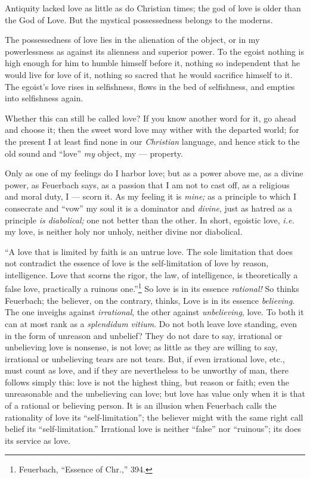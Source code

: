 Antiquity lacked love as little as do Christian times; the god of love is 
older than the God of Love. But the mystical possessedness belongs to the 
moderns.

The possessedness of love lies in the alienation of the object, or in my 
powerlessness as against its alienness and superior power. To the egoist 
nothing is high enough for him to humble himself before it, nothing so 
independent that he would live for love of it, nothing so sacred that he would 
sacrifice himself to it. The egoist's love rises in selfishness, flows in the 
bed of selfishness, and empties into selfishness again.

Whether this can still be called love? If you know another word for it, go 
ahead and choose it; then the sweet word love may wither with the departed 
world; for the present I at least find none in our \textit{Christian} 
language, and hence stick to the old sound and ``love'' \textit{my} object, 
my --- property.

Only as one of my feelings do I harbor love; but as a power above me, as a 
divine power, as Feuerbach says, as a passion that I am not to cast off, as a 
religious and moral duty, I --- scorn it. As my feeling it is \textit{mine;} as 
a principle to which I consecrate and ``vow'' my soul it is a dominator and 
\textit{divine}, just as hatred as a principle \textit{is diabolical;} one not 
better than the other. In short, egoistic love, \textit{i.e.} my love, is 
neither holy nor unholy, neither divine nor diabolical.

``A love that is limited by faith is an untrue love. The sole limitation that 
does not contradict the essence of love is the self-limitation of love by 
reason, intelligence. Love that scorns the rigor, the law, of intelligence, is 
theoretically a false love, practically a ruinous one.''\footnote{Feuerbach, 
``Essence of Chr.,'' 394.} So love is in its essence \textit{rational!} So 
thinks Feuerbach; the believer, on the contrary, thinks, Love is in its 
essence \textit{believing}. The one inveighs against \textit{irrational}, the 
other against \textit{unbelieving}, love. To both it can at most rank as a 
\textit{splendidum vitium}. Do not both leave love standing, even in the form 
of unreason and unbelief? They do not dare to say, irrational or unbelieving 
love is nonsense, is not love; as little as they are willing to say, 
irrational or unbelieving tears are not tears. But, if even irrational love, 
etc., must count as love, and if they are nevertheless to be unworthy of man, 
there follows simply this: love is not the highest thing, but reason or faith; 
even the unreasonable and the unbelieving can love; but love has value only 
when it is that of a rational or believing person. It is an illusion when 
Feuerbach calls the rationality of love its ``self-limitation''; the 
believer might with the same right call belief its ``self-limitation.'' 
Irrational love is neither ``false'' nor ``ruinous''; its does its service 
as love.


